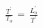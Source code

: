 \documentclass[preview]{standalone}
\begin{document}
\begin{align*}
\frac{T^{'}}{T_{o}}\,=\,\frac{L^{'}_{o}}{T^{'}}
\end{align*}
\end{document}
